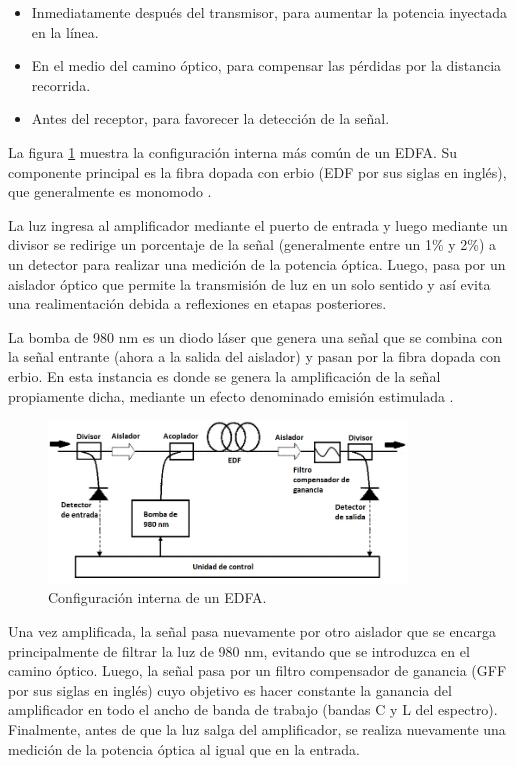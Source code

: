 \begin{itemize}
\item Inmediatamente después del transmisor, para aumentar la potencia inyectada en la línea.
\item En el medio del camino óptico, para compensar las pérdidas por la distancia recorrida.
\item Antes del receptor, para favorecer la detección de la señal.
\end{itemize}

La figura \ref{fig:EDFAinterno} muestra la configuración interna más común de un EDFA. Su componente principal es la fibra dopada con erbio (EDF por sus siglas en inglés), que generalmente es monomodo \citep{WEBSITE:FIBRA}. 

La luz ingresa al amplificador mediante el puerto de entrada y luego mediante un divisor se redirige un porcentaje de la señal (generalmente entre un 1\% y 2\%) a un detector para realizar una medición de la potencia óptica. Luego, pasa por un aislador óptico que permite la transmisión de luz en un solo sentido y así evita una realimentación debida a reflexiones en etapas posteriores.

La bomba de 980 nm es un diodo láser que genera una señal que se combina con la señal entrante (ahora a la salida del aislador) y pasan por la fibra dopada con erbio. En esta instancia es donde se genera la amplificación de la señal propiamente dicha, mediante un efecto denominado emisión estimulada \citep{WEBSITE:EDFA2}\citep{WEBSITE:EMISSION}.

\begin{figure}[H]
\centering
\includegraphics[width=0.85\textwidth]{./Figures/EDFAinterno.png}
\caption{Configuración interna de un EDFA.}
\label{fig:EDFAinterno}
\end{figure}

Una vez amplificada, la señal pasa nuevamente por otro aislador que se encarga principalmente de filtrar la luz de 980 nm, evitando que se introduzca en el camino óptico. Luego, la señal pasa por un filtro compensador de ganancia (GFF por sus siglas en inglés) cuyo objetivo es hacer constante la ganancia del amplificador en todo el ancho de banda de trabajo (bandas C y L del espectro). Finalmente, antes de que la luz salga del amplificador, se realiza nuevamente una medición de la potencia óptica al igual que en la entrada.

